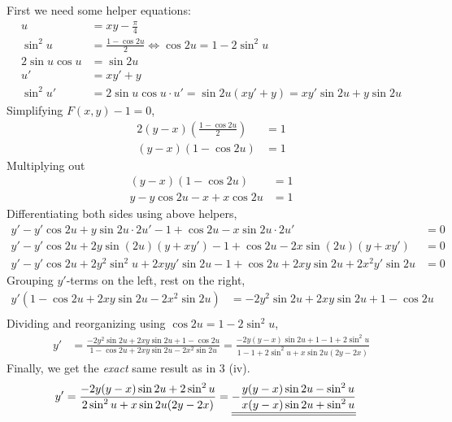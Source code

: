 First we need some helper equations:
\begin{align*}
  u &= xy-\frac{\pi}{4} \\
  \sin^2{u} &= \frac{1-\cos{2u}}{2}
      \iff \cos{2u} = 1 - 2\sin^2{u} \\
  2\sin{u}\cos{u} &= \sin{2u} \\
  u' &= xy' + y \\
  \sin^2{u}' &= 2\sin{u}\cos{u}\cdot u' = \sin{2u}(xy'+y) =
      xy'\sin{2u}+y\sin{2u}
\end{align*}
Simplifying $F(x,y)-1 = 0$,
\begin{align*}
  2(y-x)\left(\frac{1-\cos{2u}}{2}\right) &= 1 \\
  (y-x)(1-\cos{2u}) &= 1
\end{align*}
Multiplying out
\begin{align*}
  (y-x)(1-\cos{2u}) &= 1 \\
  y - y\cos{2u} -x + x\cos{2u} &= 1
\end{align*}
Differentiating both sides using above helpers,
\begin{align*}
  y' - y'\cos{2u} + y\sin{2u}\cdot 2u' - 1 + \cos{2u} - x\sin{2u}\cdot 2u' &= 0 \\
  y' - y'\cos{2u} + 2y\sin{(2u)}(y+xy') - 1 + \cos{2u} - 2x\sin{(2u)}(y+xy') &= 0 \\
  y' - y'\cos{2u} + 2y^2\sin^2{u} + 2xyy'\sin{2u} - 1 + \cos{2u}
    +2xy\sin{2u} + 2x^2y'\sin{2u} &= 0
\end{align*}
Grouping $y'$-terms on the left, rest on the right,
\begin{align*}
  y'\left( 1 - \cos{2u} + 2xy\sin{2u} - 2x^2\sin{2u} \right)
    &= -2y^2\sin{2u} + 2xy\sin{2u} + 1 - \cos{2u} \\
\end{align*}
Dividing and reorganizing using $\cos{2u} = 1 - 2\sin^2{u}$,
\begin{align*}
  y' &= \frac{-2y^2\sin{2u} + 2xy\sin{2u} + 1 - \cos{2u}}
             {1 - \cos{2u} + 2xy\sin{2u} - 2x^2\sin{2u}}
      = \frac{-2y(y-x)\sin{2u} + 1 - 1 + 2\sin^2{u}}
             {1 - 1 + 2\sin^2{u} + x\sin{2u}(2y-2x)}
\end{align*}
Finally, we get the \textit{exact} same result as in 3 (iv).
\begin{align*}
  y' &= \frac{-2y(y-x)\sin{2u} + 2\sin^2{u}}
             {2\sin^2{u} + x\sin{2u}(2y-2x)}
      = {\underline{\underline{-\frac{y(y-x)\sin{2u} - \sin^2{u}}
                    {x(y-x)\sin{2u} + \sin^2{u}}}}}
\end{align*}
